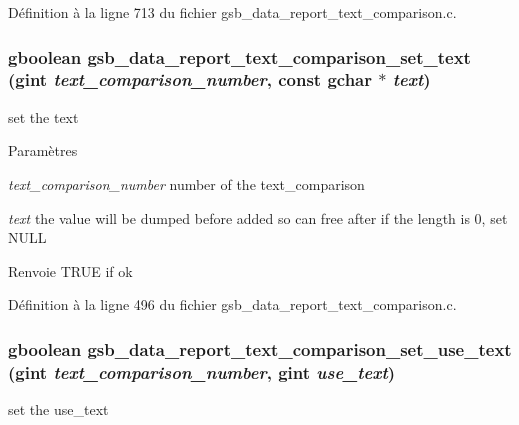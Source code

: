 Définition à la ligne 713 du fichier gsb\_\-data\_\-report\_\-text\_\-comparison.c.

\subsubsection[{gsb\_\-data\_\-report\_\-text\_\-comparison\_\-set\_\-text}]{\setlength{\rightskip}{0pt plus 5cm}gboolean gsb\_\-data\_\-report\_\-text\_\-comparison\_\-set\_\-text (gint {\em text\_\-comparison\_\-number}, \/  const gchar $\ast$ {\em text})}\label{gsb__data__report__text__comparison_8c_a4a76cff1d6c257cea41c735a4480afe8}
set the text


\begin{DoxyParams}{Paramètres}
\item[{\em text\_\-comparison\_\-number}]number of the text\_\-comparison \item[{\em text}]the value will be dumped before added so can free after if the length is 0, set NULL\end{DoxyParams}
\begin{DoxyReturn}{Renvoie}
TRUE if ok 
\end{DoxyReturn}


Définition à la ligne 496 du fichier gsb\_\-data\_\-report\_\-text\_\-comparison.c.

\subsubsection[{gsb\_\-data\_\-report\_\-text\_\-comparison\_\-set\_\-use\_\-text}]{\setlength{\rightskip}{0pt plus 5cm}gboolean gsb\_\-data\_\-report\_\-text\_\-comparison\_\-set\_\-use\_\-text (gint {\em text\_\-comparison\_\-number}, \/  gint {\em use\_\-text})}\label{gsb__data__report__text__comparison_8c_a9cff82d129475de66e8e4fbe78ff569c}
set the use\_\-text


